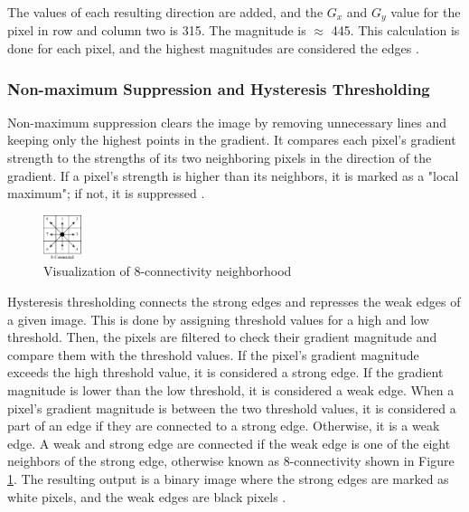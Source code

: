 \documentclass[conference]{IEEEtran}
\begin{document}
The values of each resulting direction are added, and the $G_x$ and $G_y$ value for the pixel in row and column two is 315. The magnitude is $\approx$ 445. This calculation is done for each pixel, and the highest magnitudes are considered the edges \cite{b12}.

\subsubsection{Non-maximum Suppression and Hysteresis Thresholding}

Non-maximum suppression clears the image by removing unnecessary lines and keeping only the highest points in the gradient. It compares each pixel's gradient strength to the strengths of its two neighboring pixels in the direction of the gradient. If a pixel's strength is higher than its neighbors, it is marked as a "local maximum"; if not, it is suppressed \cite{b13}. 

\begin{figure}[h]
    \centering
    \includegraphics[width=0.1\textwidth]{images/Picture15.png}
    \caption{Visualization of 8-connectivity neighborhood \cite{b13}}
    \label{fig:Picture15}
    
\end{figure}

Hysteresis thresholding connects the strong edges and represses the weak edges of a given image. This is done by assigning threshold values for a high and low threshold. Then, the pixels are filtered to check their gradient magnitude and compare them with the threshold values. If the pixel's gradient magnitude exceeds the high threshold value, it is considered a strong edge. If the gradient magnitude is lower than the low threshold, it is considered a weak edge. When a pixel's gradient magnitude is between the two threshold values, it is considered a part of an edge if they are connected to a strong edge. Otherwise, it is a weak edge. A weak and strong edge are connected if the weak edge is one of the eight neighbors of the strong edge, otherwise known as 8-connectivity shown in Figure \ref{fig:Picture15}. The resulting output is a binary image where the strong edges are marked as white pixels, and the weak edges are black pixels \cite{b13}.
\end{document}
